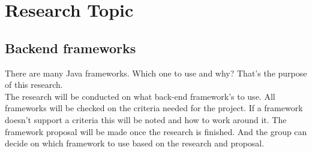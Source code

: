 \section{Research Topic}
\label{sec:research}

\subsection{Backend frameworks}

There are many Java frameworks. Which one to use and why? That's the purpose of this research. \\

The research will be conducted on what back-end framework's to use. All frameworks will be checked on the criteria needed for the project. If a framework doesn't support a criteria this will be noted and how to work around it. The framework proposal will be made once the research is finished. And the group can decide on which framework to use based on the research and proposal.\\



